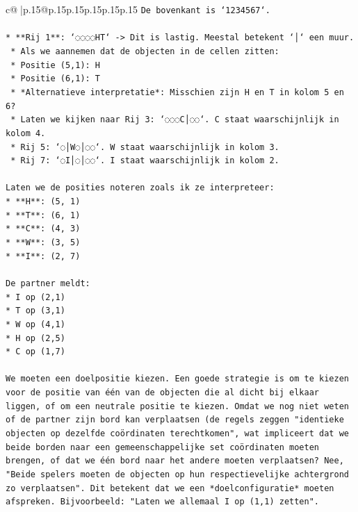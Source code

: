 \documentclass{article}
\begin{document}
{\begin{supertabular}{c@{$\;$}|p{.15\linewidth}@{}p{.15\linewidth}p{.15\linewidth}p{.15\linewidth}p{.15\linewidth}p{.15\linewidth}}
{{{\texttt{De bovenkant is `1234567`.} \\
\\ 
\texttt{*   **Rij 1**: `◌◌◌◌HT` {-}> Dit is lastig. Meestal betekent `│` een muur.} \\
\texttt{    *   Als we aannemen dat de objecten in de cellen zitten:} \\
\texttt{    *   Positie (5,1): H} \\
\texttt{    *   Positie (6,1): T} \\
\texttt{    *   *Alternatieve interpretatie*: Misschien zijn H en T in kolom 5 en 6?} \\
\texttt{    *   Laten we kijken naar Rij 3: `◌◌◌C│◌◌`. C staat waarschijnlijk in kolom 4.} \\
\texttt{    *   Rij 5: `◌│W◌│◌◌`. W staat waarschijnlijk in kolom 3.} \\
\texttt{    *   Rij 7: `◌I│◌│◌◌`. I staat waarschijnlijk in kolom 2.} \\
\\ 
\texttt{Laten we de posities noteren zoals ik ze interpreteer:} \\
\texttt{*   **H**: (5, 1)} \\
\texttt{*   **T**: (6, 1)} \\
\texttt{*   **C**: (4, 3)} \\
\texttt{*   **W**: (3, 5)} \\
\texttt{*   **I**: (2, 7)} \\
\\ 
\texttt{De partner meldt:} \\
\texttt{*   I op (2,1)} \\
\texttt{*   T op (3,1)} \\
\texttt{*   W op (4,1)} \\
\texttt{*   H op (2,5)} \\
\texttt{*   C op (1,7)} \\
\\ 
\texttt{We moeten een doelpositie kiezen. Een goede strategie is om te kiezen voor de positie van één van de objecten die al dicht bij elkaar liggen, of om een neutrale positie te kiezen. Omdat we nog niet weten of de partner zijn bord kan verplaatsen (de regels zeggen "identieke objecten op dezelfde coördinaten terechtkomen", wat impliceert dat we beide borden naar een gemeenschappelijke set coördinaten moeten brengen, of dat we één bord naar het andere moeten verplaatsen? Nee, "Beide spelers moeten de objecten op hun respectievelijke achtergrond zo verplaatsen". Dit betekent dat we een *doelconfiguratie* moeten afspreken. Bijvoorbeeld: "Laten we allemaal I op (1,1) zetten".} \\
}}}
\end{supertabular}}
\end{document}
